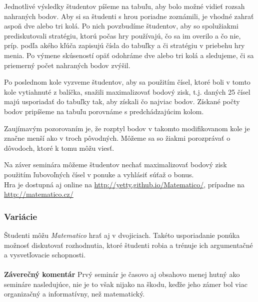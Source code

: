 {Jednotlivé výsledky študentov píšeme na tabuľu, aby bolo možné vidieť rozsah nahraných bodov. Aby si sa študenti s hrou poriadne zoznámili, je vhodné zahrať aspoň dve alebo tri kolá. Po nich povzbudíme študentov, aby so spolužiakmi prediskutovali stratégiu, ktorú počas hry používajú, čo sa im overilo a čo nie, príp. podľa akého kľúča zapisujú čísla do tabuľky a či stratégiu v priebehu hry menia. Po výmene skúseností opäť odohráme dve alebo tri kolá a sledujeme, či sa priemerný počet nahraných bodov zvýšil.

Po poslednom kole vyzveme študentov, aby sa použitím čísel, ktoré boli v tomto kole vytiahnuté z balíčka, snažili maximalizovať bodový zisk, t.j. daných 25 čísel majú usporiadať do tabuľky tak, aby získali čo najviac bodov. Získané počty bodov pripíšeme na tabuľu porovnáme s predchádzajúcim kolom.

Zaujímavým pozorovaním je, že rozptyl bodov v takomto modifikovanom kole je značne menší ako v troch pôvodných. Môžeme sa so žiakmi porozprávať o dôvodoch, ktoré k tomu môžu viesť.

Na záver seminára môžeme študentov nechať maximalizovať bodový zisk použitím ľubovoľných čísel v ponuke a vyhlásiť súťaž o bonus. \\

Hra je dostupná aj online na \url{http://yetty.github.io/Matematico/}, prípadne na \url{http://matematico.cz/}

\subsubsection*{Variácie}

Študenti môžu \textit{Matematico} hrať aj v dvojiciach. Takéto usporiadanie ponúka možnosť diskutovať rozhodnutia, ktoré študenti robia a trénuje ich argumentačné a vysvetľovacie schopnosti.\\
\\
\textbf{Záverečný komentár}
Prvý seminár je časovo aj obsahovo menej hutný ako semináre nasledujúce, nie je to však nijako na škodu, keďže jeho zámer bol viac organizačný a informatívny, než matematický.
}
